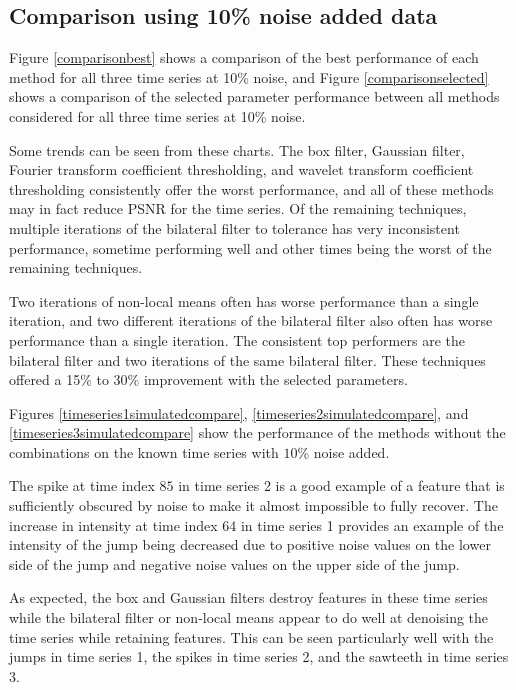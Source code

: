 \documentclass[11pt]{article}
\theoremstyle{definition}
\begin{document}
\subsection{Comparison using 10\% noise added data } 
Figure \ref{comparisonbest} shows a comparison of the best performance
of each method for all three time series at 10\% noise, and Figure
\ref{comparisonselected} shows a comparison of the selected parameter
performance between all methods considered for all three time series
at 10\% noise.

Some trends can be seen from these charts. The box filter, Gaussian
filter, Fourier transform coefficient thresholding, and wavelet
transform coefficient thresholding consistently offer the worst
performance, and all of these methods may in fact reduce PSNR for the
time series. Of the remaining techniques, multiple iterations of the
bilateral filter to tolerance has very inconsistent performance,
sometime performing well and other times being the worst of the
remaining techniques.

Two iterations of non-local means often has worse performance than a
single iteration, and two different iterations of the bilateral filter
also often has worse performance than a single iteration. The
consistent top performers are the bilateral filter and two iterations
of the same bilateral filter. These techniques offered a 15\% to 30\%
improvement with the selected parameters.

Figures \ref{timeseries1simulatedcompare},
\ref{timeseries2simulatedcompare}, and
\ref{timeseries3simulatedcompare} show the performance of the methods
without the combinations on the known time series with $10$\% noise
added.

The spike at time index $85$ in time series 2 is a good example of a
feature that is sufficiently obscured by noise to make it almost
impossible to fully recover. The increase in intensity at time index
$64$ in time series 1 provides an example of the intensity of the jump
being decreased due to positive noise values on the lower side of the
jump and negative noise values on the upper side of the jump.

As expected, the box and Gaussian filters destroy features in these
time series while the bilateral filter or non-local means appear to do
well at denoising the time series while retaining features. This can
be seen particularly well with the jumps in time series 1, the spikes
in time series 2, and the sawteeth in time series 3.
\end{document}

